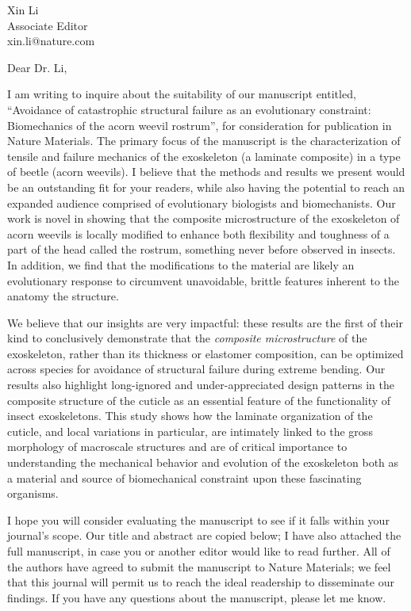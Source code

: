 \documentclass[10pt,letterpaper]{letter}
\begin{document}
 
\begin{letter}{Xin Li\\
Associate Editor\\
xin.li@nature.com\\
}
\opening{Dear Dr. Li,} 
 
I am writing to inquire about the suitability of our manuscript entitled, ``Avoidance of catastrophic structural failure as an evolutionary constraint: Biomechanics of the acorn weevil rostrum'', for consideration for publication in Nature Materials.
The primary focus of the manuscript is the characterization of tensile and failure mechanics of the exoskeleton (a laminate composite) in a type of beetle (acorn weevils).
I believe that the methods and results we present would be an outstanding fit for your readers, while also having the potential to reach an expanded audience comprised of evolutionary biologists and biomechanists.
Our work is novel in showing that the composite microstructure of the exoskeleton of acorn weevils is locally modified to enhance both flexibility and toughness of a part of the head called the rostrum, something never before observed in insects.
In addition, we find that the modifications to the material are likely an evolutionary response to circumvent unavoidable, brittle features inherent to the anatomy the structure.

We believe that our insights are very impactful: these results are the first of their kind to conclusively demonstrate that the \emph{composite microstructure} of the exoskeleton, rather than its thickness or elastomer composition, can be optimized across species for avoidance of structural failure during extreme bending.
Our results also highlight long-ignored and under-appreciated design patterns in the composite structure of the cuticle as an essential feature of the functionality of insect exoskeletons.
This study shows how the laminate organization of the cuticle, and local variations in particular, are intimately linked to the gross morphology of macroscale structures and are of critical importance to understanding the mechanical behavior and evolution of the exoskeleton both as a material and source of biomechanical constraint upon these fascinating organisms.

I hope you will consider evaluating the manuscript to see if it falls within your journal’s scope.
Our title and abstract are copied below; I have also attached the full manuscript, in case you or another editor would like to read further.
All of the authors have agreed to submit the manuscript to Nature Materials; we feel that this journal will permit us to reach the ideal readership to disseminate our findings.
If you have any questions about the manuscript, please let me know.


\end{letter}
\end{document}
